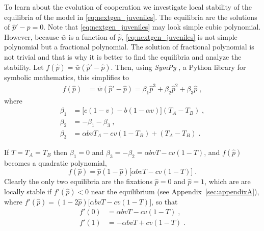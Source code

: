 \documentclass[12pt]{extarticle}
\begin{document}
To learn about the evolution of cooperation we investigate local stability of the equilibria of the model in \autoref{eq:nextgen_juveniles}.
The equilibria are the solutions of $\hat{p}'-\hat{p}=0$. Note that \autoref{eq:nextgen_juveniles} may look simple cubic polynomial. However, because $\bar{w}$ is a function of $\hat{p}$, \autoref{eq:nextgen_juveniles} is not simple polynomial but a fractional polynomial. 
The solution of fractional polynomial is not trivial and that is why it is better to find the equilibria and analyze the stability.
Let $f(\hat{p}) = \bar{w}(\hat{p}' - \hat{p})$.
Then, using \emph{SymPy} \citep{Meurer2017}, a Python library for symbolic mathematics, this simplifies to
\begin{equation} \label{eq:general_case_polynomial}
\begin{aligned}
  f(\hat{p}) &= \bar{w}(\hat{p}'-\hat{p}) =
  \beta_1 \hat{p}^3 + \beta_2 \hat{p}^2 + \beta_3 \hat{p} \;,
\end{aligned}
\end{equation}
where 
\begin{equation} \label{eq:polynomial_coefficients}
\begin{aligned}
  \beta_1 &= \big[c(1-v) - b (1-\alpha v)\big] (T_A-T_B) \;, \\
  \beta_2 &= -\beta_1 -\beta_3 \;, \\
  \beta_3 &= \alpha bvT_A - cv(1-T_B) + (T_A-T_B) \;.
\end{aligned}
\end{equation}

If $T=T_A=T_B$ then $\beta_1=0$ and $\beta_3=-\beta_2=\alpha b vT -cv(1-T)$, and $f(\hat{p})$ becomes a quadratic polynomial,
\begin{equation} \label{eq:equal_horizontal_transmission}
  f(\hat{p}) = \hat{p}(1-\hat{p})\big[\alpha bvT - cv(1-T)\big] \;.
\end{equation}
Clearly the only two equilibria are the fixations $\hat{p} =  0$ and $\hat{p} = 1$, which are are locally stable if $f'(\hat{p})<0$ near the equilibrium (see Appendix~\ref{sec:appendixA}), where
$f'(\hat{p})=(1-2\hat{p})\big[\alpha bvT - cv(1-T)\big]$, so that
\begin{equation} \label{eq:derivative_of_phattag-phat}
\begin{aligned}
	f'(0) &=	\alpha bvT - cv(1-T) \;, \\
	f'(1) &=	-\alpha bvT + cv(1-T) \;.
\end{aligned}
\end{equation}
\end{document}
